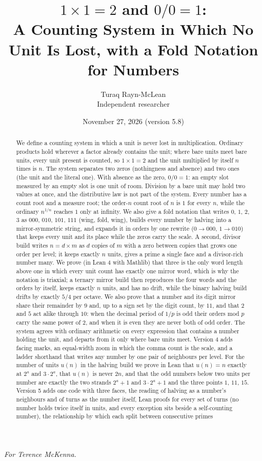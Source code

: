 \documentclass[11pt]{article}
\title{$1\times1 = 2$ and $0/0 = 1$:\\[4pt]\large A Counting System in Which No Unit Is Lost, with a Fold Notation for Numbers}
\author{Turaq Rayn-McLean\\Independent researcher}
\date{November 27, 2026 (version 5.8)}
\begin{document}
\maketitle
\begin{center}\emph{For Terence McKenna.}\end{center}

\begin{abstract}
We define a counting system in which a unit is never lost in multiplication. Ordinary products hold wherever a factor already contains the unit; where bare units meet bare units, every unit present is counted, so $1\times1 = 2$ and the unit multiplied by itself $n$ times is $n$. The system separates two zeros (nothingness and absence) and two ones (the unit and the literal one). With absence as the zero, $0/0 = 1$: an empty slot measured by an empty slot is one unit of room. Division by a bare unit may hold two values at once, and the distributive law is not part of the system. Every number has a count root and a measure root; the order-$n$ count root of $n$ is $1$ for every $n$, while the ordinary $n^{1/n}$ reaches $1$ only at infinity. We also give a fold notation that writes $0$, $1$, $2$, $3$ as $000$, $010$, $101$, $111$ (wing, fold, wing), builds every number by halving into a mirror-symmetric string, and expands it in orders by one rewrite ($0\to000$, $1\to010$) that keeps every unit and its place while the zeros carry the scale. A second, divisor build writes $n = d\times m$ as $d$ copies of $m$ with a zero between copies that grows one order per level; it keeps exactly $n$ units, gives a prime a single face and a divisor-rich number many. We prove (in Lean 4 with Mathlib) that three is the only word length above one in which every unit count has exactly one mirror word, which is why the notation is triaxial; a ternary mirror build then reproduces the four words and the orders by itself, keeps exactly $n$ units, and has no drift, while the binary halving build drifts by exactly $5/4$ per octave. We also prove that a number and its digit mirror share their remainder by $9$ and, up to a sign set by the digit count, by $11$, and that $2$ and $5$ act alike through $10$: when the decimal period of $1/p$ is odd their orders mod $p$ carry the same power of $2$, and when it is even they are never both of odd order. The system agrees with ordinary arithmetic on every expression that contains a number holding the unit, and departs from it only where bare units meet. Version 4 adds facing marks, an equal-width zoom in which the comma count is the scale, and a ladder shorthand that writes any number by one pair of neighbours per level. For the number of units $u(n)$ in the halving build we prove in Lean that $u(n) = n$ exactly at $2^a$ and $3\cdot2^a$, that $u(n)$ is never $2n$, and that the odd numbers below two units per number are exactly the two strands $2^a+1$ and $3\cdot2^a+1$ and the three points $1$, $11$, $15$. Version 5 adds one code with three faces, the reading of halving as a number's neighbours and of turns as the number itself, Lean proofs for every set of turns (no number holds twice itself in units, and every exception sits beside a self-counting number), the relationship by which each split between consecutive primes 
\end{abstract}
\end{document}
